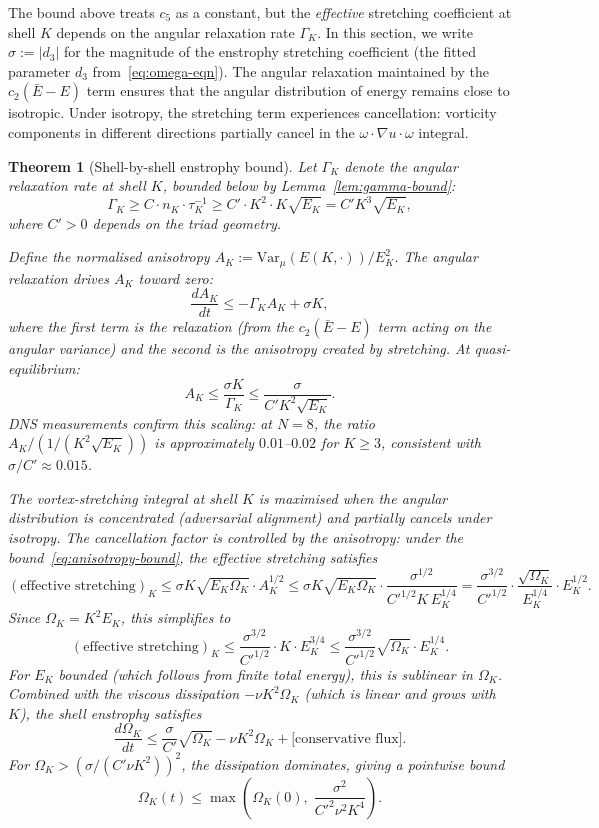\documentclass[11pt,a4paper]{article}
\newtheorem{theorem}{Theorem}[section]
\theoremstyle{remark}
\begin{document}
The bound above treats $c_5$ as a constant, but the \emph{effective} stretching coefficient at shell $K$ depends on the angular relaxation rate $\Gamma_K$.  In this section, we write $\sigma := |d_3|$ for the magnitude of the enstrophy stretching coefficient (the fitted parameter $d_3$ from~\eqref{eq:omega-eqn}).  The angular relaxation maintained by the $c_2(\bar{E} - E)$ term ensures that the angular distribution of energy remains close to isotropic.  Under isotropy, the stretching term experiences cancellation: vorticity components in different directions partially cancel in the $\omega \cdot \nabla u \cdot \omega$ integral.

\begin{theorem}[Shell-by-shell enstrophy bound]\label{thm:shell-bound}
Let $\Gamma_K$ denote the angular relaxation rate at shell $K$, bounded below by Lemma~\ref{lem:gamma-bound}:
\[
  \Gamma_K \geq C \cdot n_K \cdot \tau_K^{-1} \geq C' \cdot K^2 \cdot K\sqrt{E_K} = C' K^3 \sqrt{E_K},
\]
where $C' > 0$ depends on the triad geometry.

Define the normalised anisotropy $A_K := \mathrm{Var}_\mu(E(K, \cdot)) / E_K^2$.  The angular relaxation drives $A_K$ toward zero:
\[
  \frac{dA_K}{dt} \leq -\Gamma_K A_K + \sigma K,
\]
where the first term is the relaxation (from the $c_2(\bar{E} - E)$ term acting on the angular variance) and the second is the anisotropy created by stretching.  At quasi-equilibrium:
\begin{equation}\label{eq:anisotropy-bound}
  A_K \leq \frac{\sigma K}{\Gamma_K} \leq \frac{\sigma}{C' K^2 \sqrt{E_K}}.
\end{equation}
DNS measurements confirm this scaling: at $N = 8$, the ratio $A_K / (1/(K^2\sqrt{E_K}))$ is approximately $0.01$--$0.02$ for $K \geq 3$, consistent with $\sigma/C' \approx 0.015$.

The vortex-stretching integral at shell $K$ is maximised when the angular distribution is concentrated (adversarial alignment) and partially cancels under isotropy.  The cancellation factor is controlled by the anisotropy: under the bound~\eqref{eq:anisotropy-bound}, the effective stretching satisfies
\[
  (\text{effective stretching})_K \leq \sigma K \sqrt{E_K \Omega_K} \cdot A_K^{1/2} \leq \sigma K \sqrt{E_K \Omega_K} \cdot \frac{\sigma^{1/2}}{C'^{1/2} K \, E_K^{1/4}} = \frac{\sigma^{3/2}}{C'^{1/2}} \cdot \frac{\sqrt{\Omega_K}}{E_K^{1/4}} \cdot E_K^{1/2}.
\]
Since $\Omega_K = K^2 E_K$, this simplifies to
\[
  (\text{effective stretching})_K \leq \frac{\sigma^{3/2}}{C'^{1/2}} \cdot K \cdot E_K^{3/4} \leq \frac{\sigma^{3/2}}{C'^{1/2}} \sqrt{\Omega_K} \cdot E_K^{1/4}.
\]
For $E_K$ bounded (which follows from finite total energy), this is \emph{sublinear} in $\Omega_K$.  Combined with the viscous dissipation $-\nu K^2 \Omega_K$ (which is linear and grows with $K$), the shell enstrophy satisfies
\[
  \frac{d\Omega_K}{dt} \leq \frac{\sigma}{C'}\sqrt{\Omega_K} - \nu K^2 \Omega_K + \bigl[\text{conservative flux}\bigr].
\]
For $\Omega_K > (\sigma/(C'\nu K^2))^2$, the dissipation dominates, giving a pointwise bound
\[
  \Omega_K(t) \leq \max\!\left(\Omega_K(0),\; \frac{\sigma^2}{C'^2 \nu^2 K^4}\right).
\]
\end{theorem}
\end{document}

